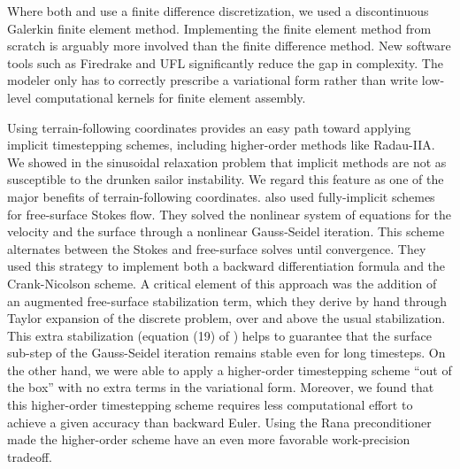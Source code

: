 \documentclass[gmd, manuscript]{copernicus}
\begin{document}
Where both \citet{greve2009dynamics} and \citet{kleiner2014numerical} use a finite difference discretization, we used a discontinuous Galerkin finite element method.
Implementing the finite element method from scratch is arguably more involved than the finite difference method.
New software tools such as Firedrake and UFL significantly reduce the gap in complexity.
The modeler only has to correctly prescribe a variational form rather than write low-level computational kernels for finite element assembly.

Using terrain-following coordinates provides an easy path toward applying implicit timestepping schemes, including higher-order methods like Radau-IIA.
We showed in the sinusoidal relaxation problem that implicit methods are not as susceptible to the drunken sailor instability.
We regard this feature as one of the major benefits of terrain-following coordinates.
\citet{ahlkrona2026fully} also used fully-implicit schemes for free-surface Stokes flow.
They solved the nonlinear system of equations for the velocity and the surface through a nonlinear Gauss-Seidel iteration.
This scheme alternates between the Stokes and free-surface solves until convergence.
They used this strategy to implement both a backward differentiation formula and the Crank-Nicolson scheme.
A critical element of this approach was the addition of an augmented free-surface stabilization term, which they derive by hand through Taylor expansion of the discrete problem, over and above the usual stabilization.
This extra stabilization (equation (19) of \citet{ahlkrona2026fully}) helps to guarantee that the surface sub-step of the Gauss-Seidel iteration remains stable even for long timesteps.
On the other hand, we were able to apply a higher-order timestepping scheme ``out of the box'' with no extra terms in the variational form.
Moreover, we found that this higher-order timestepping scheme requires less computational effort to achieve a given accuracy than backward Euler.
Using the Rana preconditioner made the higher-order scheme have an even more favorable work-precision tradeoff.
\end{document}
